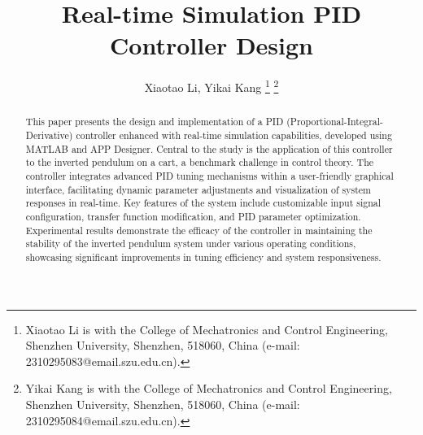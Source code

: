 \documentclass[journal,twoside,web]{ieeecolor}
\begin{document}
\title{Real-time Simulation PID Controller Design}
\author{Xiaotao Li, Yikai Kang
\thanks{Xiaotao Li is with the College of Mechatronics and Control Engineering, Shenzhen University, Shenzhen, 518060, China (e-mail: 2310295083@email.szu.edu.cn).}
\thanks{Yikai Kang is with the College of Mechatronics and Control Engineering, Shenzhen University, Shenzhen, 518060, China (e-mail: 2310295084@email.szu.edu.cn).}}


\maketitle

\begin{abstract}
This paper presents the design and implementation of a PID (Proportional-Integral-Derivative) controller enhanced with real-time simulation capabilities, developed using MATLAB and APP Designer. Central to the study is the application of this controller to the inverted pendulum on a cart, a benchmark challenge in control theory. The controller integrates advanced PID tuning mechanisms within a user-friendly graphical interface, facilitating dynamic parameter adjustments and visualization of system responses in real-time. Key features of the system include customizable input signal configuration, transfer function modification, and PID parameter optimization. Experimental results demonstrate the efficacy of the controller in maintaining the stability of the inverted pendulum system under various operating conditions, showcasing significant improvements in tuning efficiency and system responsiveness.
\end{abstract}
\end{document}

